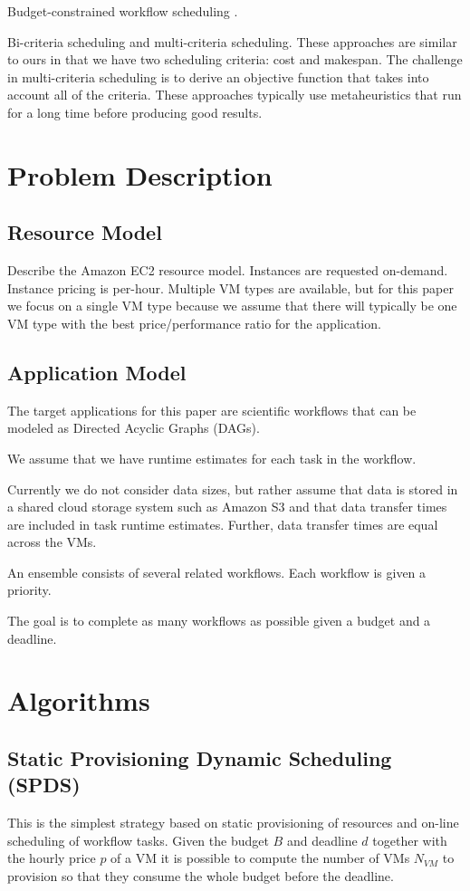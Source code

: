 \documentclass{sig-alternate}
\begin{document}
Budget-constrained workflow scheduling \cite{Sakellariou2007}.

Bi-criteria scheduling and multi-criteria scheduling. These approaches are similar to ours in that we have two scheduling criteria: cost and makespan. The challenge in multi-criteria scheduling is to derive an objective function that takes into account all of the criteria. These approaches typically use metaheuristics that run for a long time before producing good results.

\section{Problem Description}
\subsection{Resource Model}
Describe the Amazon EC2 resource model. Instances are requested on-demand. Instance pricing is per-hour. Multiple VM types are available, but for this paper we focus on a single VM type because we assume that there will typically be one VM type with the best price/performance ratio for the application.

\subsection{Application Model}
The target applications for this paper are scientific workflows that can be modeled as Directed Acyclic Graphs (DAGs).

We assume that we have runtime estimates for each task in the workflow.

Currently we do not consider data sizes, but rather assume that data is stored in a shared cloud storage system such as Amazon S3 and that data transfer times are included in task runtime estimates. Further, data transfer times are equal across the VMs.

An ensemble consists of several related workflows. Each workflow is given a priority.

The goal is to complete as many workflows as possible given a budget and a deadline.

\section{Algorithms}

\subsection{Static Provisioning Dynamic Scheduling (SPDS)}
\label{sec:spds}
This is the simplest strategy based on static provisioning of resources and
on-line scheduling of workflow tasks. Given the budget $B$ and deadline $d$
together with the hourly price $p$ of a VM it is possible to compute the number
of VMs $N_{VM}$ to provision so that they consume the whole budget before the
deadline. 
\end{document}
